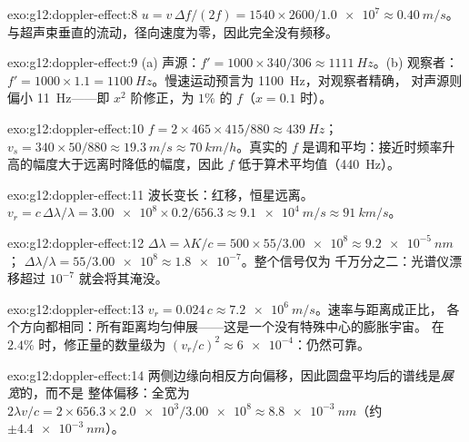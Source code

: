 \begin{solution}{exo:g12:doppler-effect:8}
$u = v\,\Delta f/(2f) = 1540 \times 2600/\num{1.0e7} \approx \qty{0.40}{m/s}$。
与超声束垂直的流动，径向速度为零，因此完全没有频移。
\end{solution}

\begin{solution}{exo:g12:doppler-effect:9}
(a) 声源：$f' = 1000 \times 340/306 \approx \qty{1111}{Hz}$。(b) 观察者：
$f' = 1000 \times 1.1 = \qty{1100}{Hz}$。慢速运动预言为 \qty{1100}{Hz}，对观察者精确，
对声源则偏小 \qty{11}{Hz}——即 $x^2$ 阶修正，为 $1\%$
的 $f$（$x = 0.1$ 时）。
\end{solution}

\begin{solution}{exo:g12:doppler-effect:10}
$f = 2 \times 465 \times 415/880 \approx \qty{439}{Hz}$；
$v_s = 340 \times 50/880 \approx \qty{19.3}{m/s} \approx \qty{70}{km/h}$。真实的 $f$
是调和平均：接近时频率升高的幅度大于远离时降低的幅度，因此
$f$ 低于算术平均值（\qty{440}{Hz}）。
\end{solution}

\begin{solution}{exo:g12:doppler-effect:11}
波长变长：红移，恒星远离。$v_r = c\,\Delta\lambda/\lambda =
\num{3.00e8} \times 0.2/656.3 \approx \qty{9.1e4}{m/s} \approx \qty{91}{km/s}$。
\end{solution}

\begin{solution}{exo:g12:doppler-effect:12}
$\Delta\lambda = \lambda K/c = 500 \times 55/\num{3.00e8} \approx \qty{9.2e-5}{nm}$；
$\Delta\lambda/\lambda = 55/\num{3.00e8} \approx \num{1.8e-7}$。整个信号仅为
千万分之二：光谱仪漂移超过 $10^{-7}$ 就会将其淹没。
\end{solution}

\begin{solution}{exo:g12:doppler-effect:13}
$v_r = 0.024\,c \approx \qty{7.2e6}{m/s}$。速率与距离成正比，
各个方向都相同：所有距离均匀伸展——这是一个没有特殊中心的膨胀宇宙。
在 $2.4\%$ 时，修正量的数量级为 $(v_r/c)^2 \approx
\num{6e-4}$：仍然可靠。
\end{solution}

\begin{solution}{exo:g12:doppler-effect:14}
两侧边缘向相反方向偏移，因此圆盘平均后的谱线是\emph{展宽}的，而不是
整体偏移：全宽为 $2\lambda v/c = 2 \times 656.3 \times \num{2.0e3}/\num{3.00e8}
\approx \qty{8.8e-3}{nm}$（约 $\pm\qty{4.4e-3}{nm}$）。
\end{solution}

